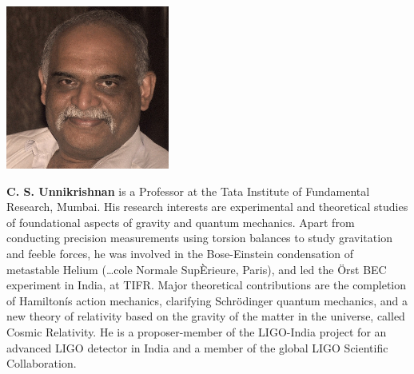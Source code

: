 \centerline{\includegraphics[scale=.7]{authorsphotos//C_S_Unnikrishnan.png}} 
\bigskip

\noindent
\textbf{C. S. Unnikrishnan} is a Professor at the Tata Institute of Fundamental Research, Mumbai. His research interests are experimental and theoretical studies of foundational aspects of gravity and quantum mechanics. Apart from conducting precision measurements using torsion balances to study gravitation and feeble forces, he was involved in the Bose-Einstein condensation of metastable Helium (…cole Normale Sup\`Erieure, Paris), and led the \"{O}rst BEC experiment in India, at TIFR. Major theoretical contributions are the completion of Hamiltonís action mechanics, clarifying Schr\"{o}dinger quantum mechanics, and a new theory of relativity based on the gravity of the matter in the universe, called Cosmic Relativity. He is a proposer-member of the LIGO-India project for an advanced LIGO detector in India and a member of the global LIGO Scientific Collaboration.

